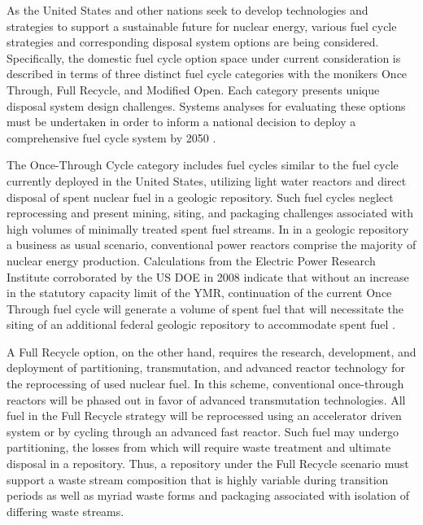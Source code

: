 

As the United States and other nations seek to develop technologies and strategies to support a 
sustainable future for nuclear energy, various fuel cycle strategies and 
corresponding disposal system options are being considered.  Specifically, the 
domestic fuel cycle option space under current consideration is described in 
terms of three distinct fuel cycle categories with the monikers Once Through, 
Full Recycle, and Modified Open. Each category presents unique disposal system 
design challenges. Systems analyses for evaluating these options must 
be undertaken in order to inform a national decision to deploy a comprehensive 
fuel cycle system by 2050 \cite{doe_nuclear_2010}. 


The Once-Through Cycle category includes fuel cycles similar to the fuel cycle 
currently deployed in the United States, utilizing light water reactors and 
direct disposal of spent nuclear fuel in a geologic repository.
Such fuel cycles neglect reprocessing and present mining, siting, and packaging 
challenges associated with high volumes of minimally treated spent fuel streams.  In in a geologic 
repository a business as usual 
scenario, conventional power reactors comprise the majority of nuclear energy 
production. 
Calculations from the Electric Power Research Institute corroborated by 
the \gls{US} \gls{DOE} in 2008 indicate that without an increase in the statutory 
capacity limit of the \gls{YMR}, continuation of the current Once Through fuel 
cycle will generate a volume of spent fuel that will necessitate
the siting of an additional federal geologic repository to accommodate spent 
fuel \cite{kessler_room_2006, doe_report_2008}. 


A Full Recycle option, on the other hand, requires the research, development, 
and deployment of partitioning, transmutation, and advanced reactor technology 
for the reprocessing of used nuclear fuel.  In this scheme, conventional 
once-through reactors will be phased out in favor of advanced transmutation 
technologies. All fuel in the Full Recycle strategy will be 
reprocessed using an accelerator driven system or by 
cycling through an advanced fast reactor. Such fuel may undergo partitioning, 
the losses from which will require waste treatment and ultimate disposal in a 
repository. Thus, a repository under the Full Recycle scenario must support
a waste stream composition that is highly variable during transition periods as 
well as myriad waste forms and packaging associated with isolation of differing 
waste streams.

